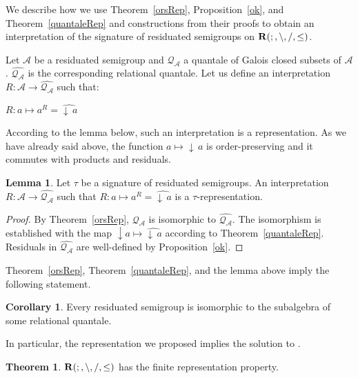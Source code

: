 \documentclass[a4paper]{article}
\theoremstyle{definition}
\theoremstyle{theorem}
\newtheorem{theorem}{Theorem}
\theoremstyle{proposition}
\theoremstyle{lemma}
\newtheorem{lemma}{Lemma}
\theoremstyle{ex}
\theoremstyle{corollary}
\newtheorem{corollary}{Corollary}
\theoremstyle{claim}
\newcommand{\down}[1]{\ensuremath{{\downarrow}\,#1}}
\begin{document}
We describe how we use Theorem~\ref{orsRep}, Proposition~\ref{ok}, and Theorem~\ref{quantaleRep} and constructions from their proofs to obtain an interpretation of the signature of residuated semigroups on ${\bf R}(;, \setminus, /, \leq)$.

Let $\mathcal{A}$ be a residuated semigroup and $\mathcal{Q}_{\mathcal{A}}$ a quantale of Galois closed subsets of $\mathcal{A}$. $\widehat{\mathcal{Q}_{\mathcal{A}}}$ is the corresponding relational quantale. Let us define an interpretation $R : \mathcal{A} \to \widehat{\mathcal{Q}_{\mathcal{A}}}$ such that:

\begin{center}
  $R : a \mapsto a^{R} = \widehat{\down{a}}$
\end{center}

According to the lemma below, such an interpretation is a representation. As we have already said above, the function $a \mapsto \down{a}$ is order-preserving and it commutes with products and residuals.

\begin{lemma}
  Let $\tau$ be a signature of residuated semigroups. An interpretation $R : \mathcal{A} \to \widehat{\mathcal{Q}_{\mathcal{A}}}$ such that $R : a \mapsto a^{R} = \widehat{\down{a}}$ is a $\tau$-representation.
\end{lemma}

\begin{proof}
  By Theorem~\ref{orsRep}, $\mathcal{Q}_{\mathcal{A}}$ is isomorphic to $\widehat{\mathcal{Q}_{\mathcal{A}}}$. The isomorphism is established with the map $\downarrow{a} \mapsto \widehat{\down{a}}$ according to Theorem~\ref{quantaleRep}.
  Residuals in $\widehat{\mathcal{Q}_{\mathcal{A}}}$ are well-defined by Proposition~\ref{ok}.
\end{proof}

Theorem~\ref{orsRep}, Theorem~\ref{quantaleRep}, and the lemma above imply the following statement.
\begin{corollary} \label{orsRep2}
  Every residuated semigroup is isomorphic to the subalgebra of some relational quantale.
\end{corollary}

In particular, the representation we proposed implies the solution to \cite[Problem 19.17]{hirsch2002relation}.
\begin{theorem} \label{solution}
  ${\bf R}(;, \setminus, /, \leq)$ has the finite representation property.
\end{theorem}
\end{document}
